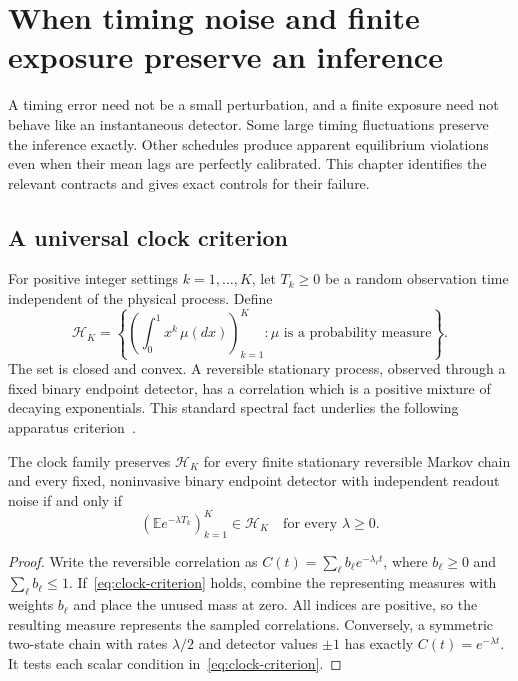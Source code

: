 \chapter{When timing noise and finite exposure preserve an inference}
\label{ch:virtual-timing}

A timing error need not be a small perturbation, and a finite exposure need not
behave like an instantaneous detector. Some large timing fluctuations preserve
the inference exactly. Other schedules produce apparent equilibrium violations
even when their mean lags are perfectly calibrated. This chapter identifies the
relevant contracts and gives exact controls for their failure.

\section{A universal clock criterion}
For positive integer settings $k=1,\ldots,K$, let $T_k\geq0$ be a random
observation time independent of the physical process. Define
\[
 \mathcal H_K=\left\{\left(\int_0^1x^k\,\mu(dx)\right)_{k=1}^K:
 \mu\text{ is a probability measure}\right\}.
\]
The set is closed and convex. A reversible stationary process, observed through
a fixed binary endpoint detector, has a correlation which is a positive mixture
of decaying exponentials. This standard spectral fact underlies the following
apparatus criterion~\cite{vlAldousFill2002,vlSchilling2012}.

\begin{theorem}
The clock family preserves $\mathcal H_K$ for every finite stationary reversible
Markov chain and every fixed, noninvasive binary endpoint detector with independent
readout noise if and only if
\begin{equation}
 \left(\mathbb E e^{-\lambda T_k}\right)_{k=1}^K\in\mathcal H_K
 \quad\text{for every }\lambda\geq0.
 \label{eq:clock-criterion}
\end{equation}
\end{theorem}
\begin{proof}
Write the reversible correlation as
$C(t)=\sum_\ell b_\ell e^{-\lambda_\ell t}$, where $b_\ell\geq0$ and
$\sum_\ell b_\ell\leq1$. If~\eqref{eq:clock-criterion} holds, combine the
representing measures with weights $b_\ell$ and place the unused mass at zero.
All indices are positive, so the resulting measure represents the sampled
correlations. Conversely, a symmetric two-state chain with rates $\lambda/2$
and detector values $\pm1$ has exactly $C(t)=e^{-\lambda t}$. It tests each
scalar condition in~\eqref{eq:clock-criterion}.
\end{proof}

